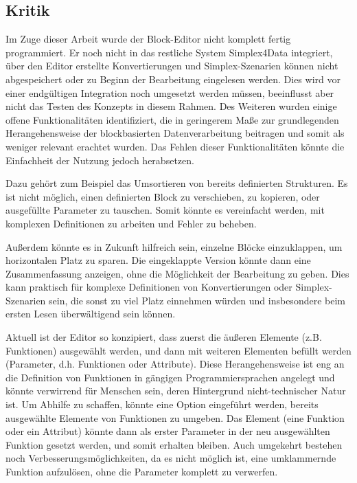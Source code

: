 \subsection{Kritik}
\label{sec:criticism}

Im Zuge dieser Arbeit wurde der Block-Editor nicht komplett fertig programmiert. Er noch nicht in das restliche System Simplex4Data integriert, über den Editor erstellte Konvertierungen und Simplex-Szenarien können nicht abgespeichert oder zu Beginn der Bearbeitung eingelesen werden. Dies wird vor einer endgültigen Integration noch umgesetzt werden müssen, beeinflusst aber nicht das Testen des Konzepts in diesem Rahmen. Des Weiteren wurden einige offene Funktionalitäten identifiziert, die in geringerem Maße zur grundlegenden Herangehensweise der blockbasierten Datenverarbeitung beitragen und somit als weniger relevant erachtet wurden. Das Fehlen dieser Funktionalitäten könnte die Einfachheit der Nutzung jedoch herabsetzen.

Dazu gehört zum Beispiel das Umsortieren von bereits definierten Strukturen. Es ist nicht möglich, einen definierten Block zu verschieben, zu kopieren, oder ausgefüllte Parameter zu tauschen. Somit könnte es vereinfacht werden, mit komplexen Definitionen zu arbeiten und Fehler zu beheben.

Außerdem könnte es in Zukunft hilfreich sein, einzelne Blöcke einzuklappen, um horizontalen Platz zu sparen. Die eingeklappte Version könnte dann eine Zusammenfassung anzeigen, ohne die Möglichkeit der Bearbeitung zu geben. Dies kann praktisch für komplexe Definitionen von Konvertierungen oder Simplex-Szenarien sein, die sonst zu viel Platz einnehmen würden und insbesondere beim ersten Lesen überwältigend sein können.

Aktuell ist der Editor so konzipiert, dass zuerst die äußeren Elemente (z.B. Funktionen) ausgewählt werden, und dann mit weiteren Elementen befüllt werden (Parameter, d.h. Funktionen oder Attribute). Diese Herangehensweise ist eng an die Definition von Funktionen in gängigen Programmiersprachen angelegt und könnte verwirrend für Menschen sein, deren Hintergrund nicht-technischer Natur ist. Um Abhilfe zu schaffen, könnte eine Option eingeführt werden, bereits ausgewählte Elemente von Funktionen zu umgeben. Das Element (eine Funktion oder ein Attribut)  könnte dann als erster Parameter in der neu ausgewählten Funktion gesetzt werden, und somit erhalten bleiben. Auch umgekehrt bestehen noch Verbesserungsmöglichkeiten, da es nicht möglich ist, eine umklammernde Funktion aufzulösen, ohne die Parameter komplett zu verwerfen.

